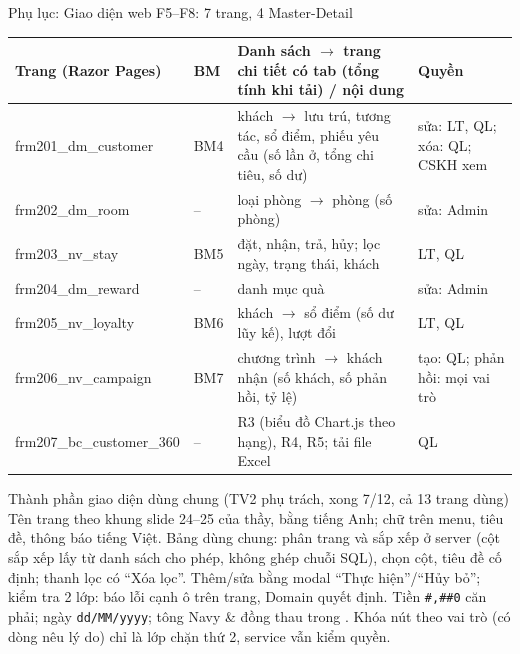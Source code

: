 \begin{frame}{Phụ lục: Giao diện web F5--F8: 7 trang, 4 Master-Detail \TB}
\scriptsize
\begin{tabularx}{\textwidth}{@{}L{3.3cm}L{0.7cm}YL{2.9cm}@{}}
\toprule
\textbf{Trang (Razor Pages)} & \textbf{BM} & \textbf{Danh sách $\to$ trang chi tiết có tab (tổng tính khi tải) / nội dung} & \textbf{Quyền} \\
\midrule
frm201\_dm\_customer & BM4 & khách $\to$ lưu trú, tương tác, sổ điểm, phiếu yêu cầu (số lần ở, tổng chi tiêu, số dư) & sửa: LT, QL; xóa: QL; CSKH xem \\
frm202\_dm\_room & -- & loại phòng $\to$ phòng (số phòng) & sửa: Admin \\
frm203\_nv\_stay & BM5 & đặt, nhận, trả, hủy; lọc ngày, trạng thái, khách & LT, QL \\
frm204\_dm\_reward & -- & danh mục quà & sửa: Admin \\
frm205\_nv\_loyalty & BM6 & khách $\to$ sổ điểm (số dư lũy kế), lượt đổi & LT, QL \\
frm206\_nv\_campaign & BM7 & chương trình $\to$ khách nhận (số khách, số phản hồi, tỷ lệ) & tạo: QL; phản hồi: mọi vai trò \\
frm207\_bc\_customer\_360 & -- & R3 (biểu đồ Chart.js theo hạng), R4, R5; tải file Excel & QL \\
\bottomrule
\end{tabularx}

\vspace{2mm}
\begin{block}{Thành phần giao diện dùng chung (TV2 phụ trách, xong 7/12, cả 13 trang dùng)}
\tiny Tên trang theo khung slide 24--25 của thầy, bằng tiếng Anh; chữ trên menu, tiêu đề, thông báo tiếng Việt. Bảng dùng chung: phân trang và sắp xếp ở server (cột sắp xếp lấy từ danh sách cho phép, không ghép chuỗi SQL), chọn cột, tiêu đề cố định; thanh lọc có ``Xóa lọc''. Thêm/sửa bằng modal ``Thực hiện''/``Hủy bỏ''; kiểm tra 2 lớp: báo lỗi cạnh ô trên trang, Domain quyết định. Tiền \texttt{\#,\#\#0} căn phải; ngày \texttt{dd/MM/yyyy}; tông Navy \& đồng thau trong . Khóa nút theo vai trò (có dòng nêu lý do) chỉ là lớp chặn thứ 2, service vẫn kiểm quyền.
\end{block}
\end{frame}

